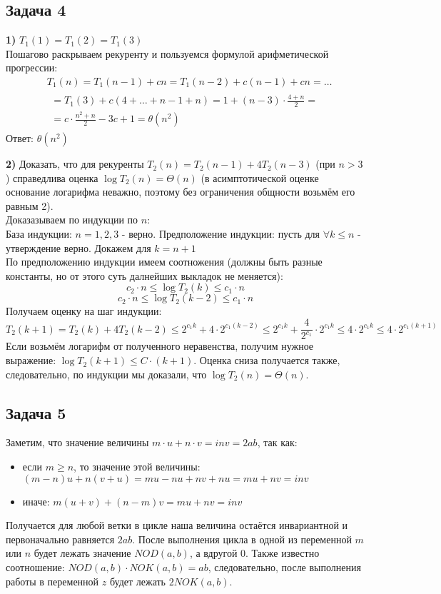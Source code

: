 \documentclass[a4paper,12pt]{article} %
\begin{document}
\subsection*{Задача 4}
{\bf 1)} $T_{1}(1)=T_{1}(2)=T_{1}(3)$\\
Пошагово раскрываем рекуренту и пользуемся формулой арифметической прогрессии:\\
$$
\begin{aligned}
&T_{1}(n)=T_{1}(n-1)+c n=T_{1}(n-2)+c(n-1)+c n=\ldots\\
&\begin{array}{l}
=T_{1}(3)+c(4+\ldots+n-1+n)=1+(n-3) \cdot \frac{4+n}{2}= \\
=c \cdot \frac{n^{2}+n}{2}-3 c+1=\theta\left(n^{2}\right)
\end{array}
\end{aligned}
$$
Ответ: $\theta\left(n^{2}\right)$

{\bf 2)} Доказать, что  для рекуренты $T_2(n) = T_2(n-1)+4T_2(n-3)$ (при $n > 3$) справедлива оценка $\log T_2(n) = \Theta(n)$ (в асимптотической оценке основание логарифма неважно, поэтому без ограничения общности возьмём его равным 2).\\
Доказазываем по индукции по $ n $:\\
База индукции: $ n = 1,2,3 $ - верно.
Предположение индукции: пусть для $ \forall k \leq n $ - утверждение верно. Докажем для $ k = n + 1 $\\
По предположению индукции имеем соотножения (должны быть разные константы, но от этого суть далнейших выкладок не меняется):\\
$$
c_{2} \cdot n \leq \log T_{2}(k) \leq c_{1} \cdot n
$$
$$
c_{2} \cdot n \leq \log T_{2}(k - 2) \leq c_{1} \cdot n
$$
Получаем оценку на шаг индукции:
$$
T_{2}(k+1)=T_{2}(k)+4 T_{2}(k-2) \leq 2^{c_1k} +4 \cdot 2^{c_{1}(k-2)} \leq 2^{c_{1} k}+\frac{4}{2^{c_1}} \cdot 2^{c_{1} k} \leq 4 \cdot 2^{c_{1} k} \leq 4 \cdot 2^{c_{1}(k+1)}
$$
Если возьмём логарифм от полученного неравенства, получим нужное выражение: $ \log T_2(k+1) \leq C \cdot (k+1) $. Оценка сниза получается также, следовательно, по индукции мы доказали, что $\log T_2(n) = \Theta(n)$.

\subsection*{Задача 5}
Заметим, что значение величины $ m \cdot u + n \cdot v = inv = 2ab$, так как:\\
\begin{itemize}
\item если $ m \geq n $, то значение этой величины: $ (m-n) u+n(v+u)=m u-n u+n v+n u= mu + nv = inv $\\
\item иначе: $ m(u+v)+(n-m) v= mu + nv = inv $\\
\end{itemize}
Получается для любой ветки в цикле наша величина остаётся инвариантной и первоначально равняется $2ab$. После выполнения цикла в одной из переменной $ m $ или $n$ будет лежать значение $ NOD(a,b) $, а вдругой 0. Также известно соотношение: $NOD(a,b) \cdot NOK(a,b) = ab$, следовательно, после выполнения работы в переменной $z$ будет лежать $2NOK(a,b)$.
\end{document}

